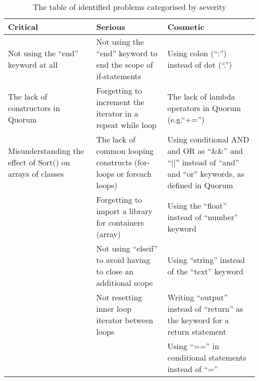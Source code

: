 \begin{table}[]
\centering
\renewcommand{\arraystretch}{1.5}
\caption{The table of identified problems categorised by severity}
\label{QuorumProblemResult}
\begin{tabular}{| p{5cm} | p{5cm} | p{5cm} |}
\hline
\textbf{Critical}                                          & \textbf{Serious}                                                   & \textbf{Cosmetic}                                                                                        \\ \hline
Not using the “end” keyword at all                         & Not using the “end” keyword to end the scope of if-statements      & Using colon (“:”) instead of dot (“.”)                                                                   \\ \hline
The lack of constructors in Quorum                         & Forgetting to increment the iterator in a repeat while loop        & The lack of lambda operators in Quorum (e.g.“+=”)                                                        \\ \hline
Misunderstanding the effect of Sort() on arrays of classes & The lack of common looping constructs (for-loops or foreach loops) & Using conditional AND and OR as “\&\&” and “||” instead of “and” and “or” keywords, as defined in Quorum \\ \hline
                                                           & Forgetting to import a library for containers (array)              & Using the “float” instead of “number” keyword                                                            \\ \hline
                                                           & Not using “elseif” to avoid having to close an additional scope    & Using “string” instead of the “text” keyword                                                             \\ \hline
                                                           & Not resetting inner loop iterator between loops                    & Writing “output” instead of “return” as the keyword for a return statement                               \\ \hline
                                                           &                                                                    & Using “==” in conditional statements instead of “=”                                                      \\ \hline

\end{tabular}
\end{table}
